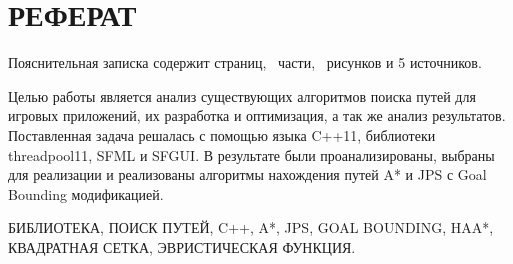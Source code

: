 \section*{РЕФЕРАТ}

\thispagestyle{empty}

Пояснительная записка содержит \pageref{LastPage} страниц, \totalsections\ части, \totalfigures\ рисунков и 5 источников.

Целью работы является анализ существующих алгоритмов поиска путей для игровых приложений, их разработка и оптимизация, а так же анализ результатов. Поставленная задача решалась с помощью языка C++11, библиотеки threadpool11, SFML и SFGUI. В результате были проанализированы, выбраны для реализации и реализованы алгоритмы нахождения путей A* и JPS с Goal Bounding модификацией.


БИБЛИОТЕКА, ПОИСК ПУТЕЙ, C++, A*, JPS, GOAL BOUNDING, HAA*, КВАДРАТНАЯ СЕТКА, ЭВРИСТИЧЕСКАЯ ФУНКЦИЯ.